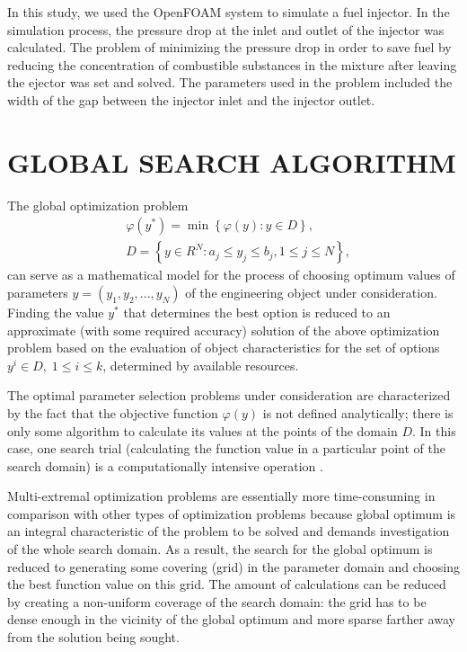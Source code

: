 \documentclass{aip-cp}
\begin{document}
In this study, we used the OpenFOAM system to simulate a fuel injector. In the simulation process, the pressure drop at the inlet and outlet of the injector was calculated. The problem of minimizing the pressure drop in order to save fuel by reducing the concentration of combustible substances in the mixture after leaving the ejector was set and solved. The parameters used in the problem included the width of the gap between the injector inlet and the injector outlet.

\section{GLOBAL SEARCH ALGORITHM}


The global optimization problem
\begin{eqnarray}\label{problem}
&\varphi(y^\ast)=\min{\left\{\varphi(y):y\in D\right\}},\\
&D=\left\{y\in R^N: a_j\leq y_j \leq b_j, 1\leq j \leq N \right\},\label{D}
\end{eqnarray}
can serve as a mathematical model for the process of choosing optimum values of parameters $y=(y_1,y_2,...,y_N)$ of the engineering object under consideration.
Finding the value $y^*$ that determines the best option is reduced to an approximate (with some required accuracy) solution of the above optimization problem based on the evaluation of object characteristics for the set of options $y^i\in D, \; 1 \leq i \leq k$, determined by available resources.

The optimal parameter selection problems under consideration are characterized by the fact that the objective function $\varphi(y)$ is not defined analytically; there is only some algorithm to calculate its values at the points of the domain $D$.  In this case, one search trial (calculating the function value in a particular point of the search domain) is a computationally intensive operation \cite{Sergeyev1999,Kvasov2013,Kalyulin2017,Sergeyev2018,Paulavicius2020}.%

Multi-extremal optimization problems are essentially more time-consuming in comparison with other types of optimization problems because global optimum is an integral characteristic of the problem to be solved and demands investigation of the whole search domain. As a result, the search for the global optimum is reduced to generating  some covering (grid) in the parameter domain and choosing the best function value on this grid. The amount of calculations can be reduced by creating a non-uniform coverage of the search domain: the grid has to be dense enough in the vicinity of the global optimum and more sparse farther away from the solution being sought.
\end{document}

